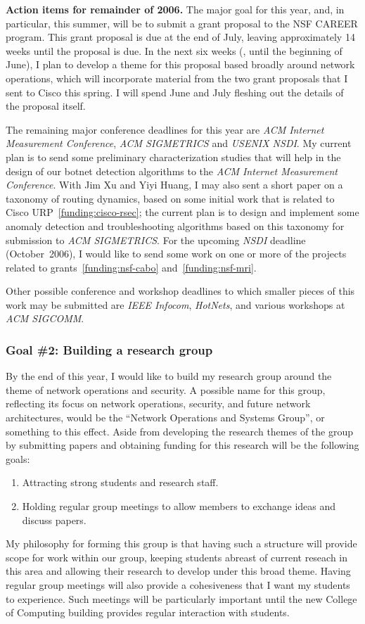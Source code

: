 {\bf Action items for remainder of 2006.} The major goal for this year,
and, in particular, this summer, will be to submit a grant proposal to
the NSF CAREER program.  This grant proposal is due at the end of July,
leaving approximately 14 weeks until the proposal is due.  In the next
six weeks (\ie, until the beginning of June), I plan to develop a theme
for this proposal based broadly around network operations, which will
incorporate material from the two grant proposals that I sent to Cisco
this spring.  I will spend June and July fleshing out the details of the
proposal itself.

The remaining major conference deadlines for this year are {\em ACM
Internet Measurement Conference}, {\em ACM SIGMETRICS} and {\em USENIX
NSDI}.  My current plan is to send some preliminary characterization
studies that will help in the design of our botnet detection algorithms
to the {\em ACM Internet Measurement Conference}.  With Jim Xu and Yiyi
Huang, I may also sent a short paper on a taxonomy of routing dynamics,
based on some initial work that is related to Cisco
URP~\ref{funding:cisco-rsec}; the current plan is to design and
implement some anomaly detection and troubleshooting algorithms based on
this taxonomy for submission to {\em ACM SIGMETRICS}.  For the upcoming
{\em NSDI} deadline (October~2006), I would like to send some work on
one or more of the projects related to grants~\ref{funding:nsf-cabo}
and~\ref{funding:nsf-mri}.

Other possible conference and workshop deadlines to which smaller pieces
of this work may be submitted are {\em IEEE Infocom}, {\em HotNets}, and
various workshops at {\em ACM SIGCOMM}.

\subsubsection*{Goal \#2: Building a research group}

By the end of this year, I would like to build my research group around
the theme of network operations and security.  A possible name for this
group, reflecting its focus on network operations, security, and future
network architectures, would be the ``Network Operations and Systems
Group'', or something to this effect.  Aside from developing the
research themes of the group by submitting papers and obtaining funding
for this research will be the following goals:

\begin{enumerate}
\item Attracting strong students and research staff.
\item Holding regular group meetings to allow members to
exchange ideas and discuss papers.
\end{enumerate}
My philosophy for forming this group is that having such a structure
will provide scope for work within our group, keeping students abreast
of current reseach in this area and allowing their research to develop
under this broad theme.  Having regular group meetings will also provide
a cohesiveness that I want my students to experience.  Such meetings
will be particularly important until the new College of Computing
building provides regular interaction with students.

